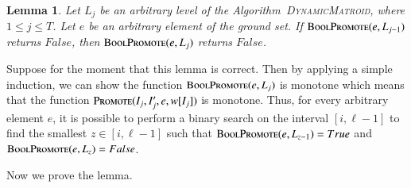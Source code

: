 \documentclass[11pt]{article}
\newtheorem{lemma}[theorem]{Lemma}
\newcommand{\suit}{\textsc{Promote}}
\newcommand{\boolsuit}{\textsc{BoolPromote}}
\newcommand{\dynamicmatroid}{\textsc{DynamicMatroid}}
\begin{document}
\begin{lemma}
\label{lm:binary_search_argument}
Let $L_j$ be an arbitrary level of the Algorithm~\dynamicmatroid{}, where $1 \le j \le T$. 
Let $e$ be an arbitrary element of the ground set. 
If $\boolsuit(e,L_{j-1})$ returns $False$, then 
$\boolsuit(e,L_{j})$ returns $False$. 
\end{lemma}

Suppose for the moment that this lemma is correct. 
Then by applying a simple induction, 
we can show the function $\boolsuit(e,L_j)$ 
is monotone which means that the function $\suit(I_j, I'_j, e, w[I_j])$ is monotone. 
Thus, for every arbitrary element $e$, 
it is possible to perform a binary search on the interval $[i, \ell-1]$ 
to find the smallest $z\in [i, \ell-1]$ such that $\boolsuit(e,L_{z-1}) = True$ and $\boolsuit(e,L_z) = False$.   


Now we prove the lemma. 
\end{document}

